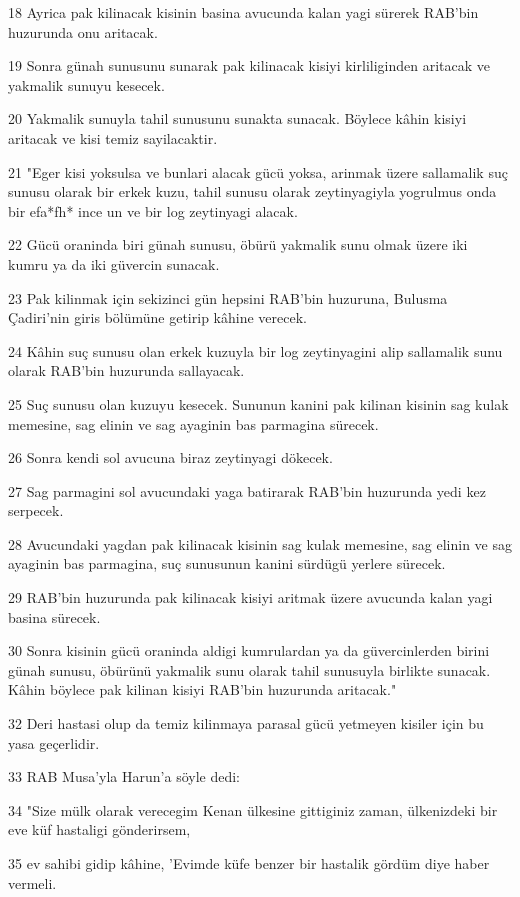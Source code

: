 \par 18 Ayrica pak kilinacak kisinin basina avucunda kalan yagi sürerek RAB'bin huzurunda onu aritacak.
\par 19 Sonra günah sunusunu sunarak pak kilinacak kisiyi kirliliginden aritacak ve yakmalik sunuyu kesecek.
\par 20 Yakmalik sunuyla tahil sunusunu sunakta sunacak. Böylece kâhin kisiyi aritacak ve kisi temiz sayilacaktir.
\par 21 "Eger kisi yoksulsa ve bunlari alacak gücü yoksa, arinmak üzere sallamalik suç sunusu olarak bir erkek kuzu, tahil sunusu olarak zeytinyagiyla yogrulmus onda bir efa*fh* ince un ve bir log zeytinyagi alacak.
\par 22 Gücü oraninda biri günah sunusu, öbürü yakmalik sunu olmak üzere iki kumru ya da iki güvercin sunacak.
\par 23 Pak kilinmak için sekizinci gün hepsini RAB'bin huzuruna, Bulusma Çadiri'nin giris bölümüne getirip kâhine verecek.
\par 24 Kâhin suç sunusu olan erkek kuzuyla bir log zeytinyagini alip sallamalik sunu olarak RAB'bin huzurunda sallayacak.
\par 25 Suç sunusu olan kuzuyu kesecek. Sununun kanini pak kilinan kisinin sag kulak memesine, sag elinin ve sag ayaginin bas parmagina sürecek.
\par 26 Sonra kendi sol avucuna biraz zeytinyagi dökecek.
\par 27 Sag parmagini sol avucundaki yaga batirarak RAB'bin huzurunda yedi kez serpecek.
\par 28 Avucundaki yagdan pak kilinacak kisinin sag kulak memesine, sag elinin ve sag ayaginin bas parmagina, suç sunusunun kanini sürdügü yerlere sürecek.
\par 29 RAB'bin huzurunda pak kilinacak kisiyi aritmak üzere avucunda kalan yagi basina sürecek.
\par 30 Sonra kisinin gücü oraninda aldigi kumrulardan ya da güvercinlerden birini günah sunusu, öbürünü yakmalik sunu olarak tahil sunusuyla birlikte sunacak. Kâhin böylece pak kilinan kisiyi RAB'bin huzurunda aritacak."
\par 32 Deri hastasi olup da temiz kilinmaya parasal gücü yetmeyen kisiler için bu yasa geçerlidir.
\par 33 RAB Musa'yla Harun'a söyle dedi:
\par 34 "Size mülk olarak verecegim Kenan ülkesine gittiginiz zaman, ülkenizdeki bir eve küf hastaligi gönderirsem,
\par 35 ev sahibi gidip kâhine, 'Evimde küfe benzer bir hastalik gördüm diye haber vermeli.
